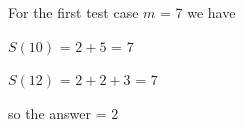 For the first test case $m$ = 7
we have 

$S(10)$ = $2 + 5$ = $7$

$S(12)$ = $2 + 2 + 3$ = $7$

so the answer = $2$